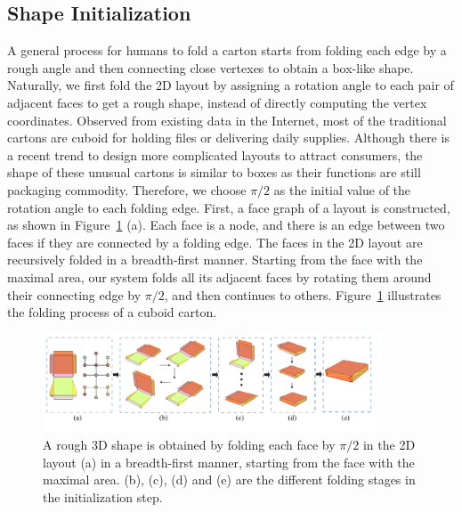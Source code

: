 \subsection{Shape Initialization}\label{sec:initialization}


A general process for humans to fold a carton starts from folding each edge by a rough angle and then connecting close vertexes to obtain a box-like shape. 
Naturally, we first fold the 2D layout by assigning a rotation angle to each pair of adjacent faces to get a rough shape, instead of directly computing the vertex coordinates.
%	
Observed from existing data in the Internet, most of the traditional cartons are cuboid for holding files or delivering daily supplies. 
Although there is a recent trend to design more complicated layouts to attract consumers, the shape of these unusual cartons is similar to boxes as their functions are still packaging commodity. 
%
Therefore, we choose $\pi/2$ as the initial value of the rotation angle to each folding edge. 
%
First, a face graph of a layout is constructed, as shown in Figure~\ref{fig:midresult} (a).
Each face is a node, and there is an edge between two faces if they are connected by a folding edge.
%
The faces in the 2D layout are recursively folded in a breadth-first manner.
Starting from the face with the maximal area, our system folds all its adjacent faces by rotating them around their connecting edge by $\pi/2$, and then continues to others. 
Figure~\ref{fig:midresult} illustrates the folding process of a cuboid carton. 

\begin{figure}[ht]
	\centering
	\includegraphics[width=0.9\textwidth]{images/midresult}
	\caption{A rough 3D shape is obtained by folding each face by $\pi/2$ in the 2D layout (a) in a breadth-first manner, starting from the face with the maximal area. (b), (c), (d) and (e) are the different folding stages in the initialization step.}
	\label{fig:midresult}
\end{figure}


